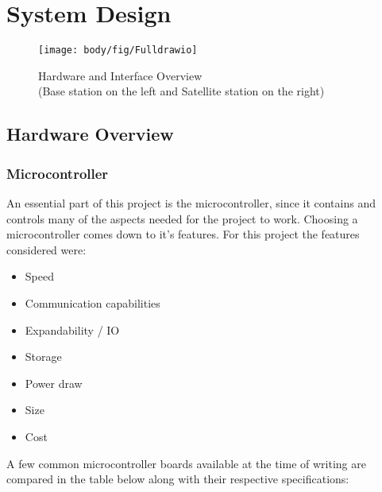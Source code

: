 \chapter{System Design}



\begin{figure}[!htb]
	\centering
	\texttt{[image: body/fig/Fulldrawio]}
	\caption{Hardware and Interface Overview \\(Base station on the left and Satellite station on the right) }
	\label{fig:fulldrawio}
\end{figure}

\section{Hardware Overview}
\subsection{Microcontroller}
An essential part of this project is the microcontroller, since it contains and controls many of the aspects needed for the project to work.
Choosing a microcontroller comes down to it's features. For this project the features considered were:
\begin{itemize}
	\item Speed
	\item Communication capabilities
	\item Expandability / IO
	\item Storage
	\item Power draw
	\item Size
	\item Cost
\end{itemize}

\noindent
A few common microcontroller boards available at the time of writing are compared in the table below along with their respective specifications:


